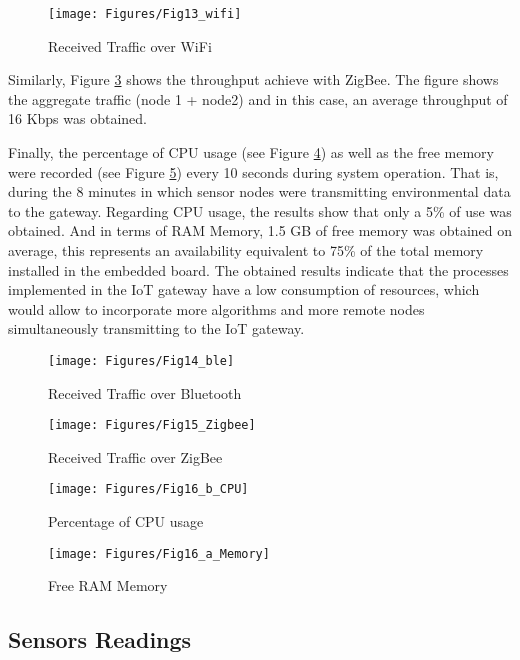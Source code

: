 \begin{figure}[ht!]
\centering
\texttt{[image: Figures/Fig13\_wifi]}
\caption{Received Traffic over WiFi}
\label{ch5_fig:13}       %
\end{figure}

Similarly, Figure \ref{ch5_fig:15} shows the throughput achieve with ZigBee. The figure shows the aggregate traffic (node 1 + node2) and in this case, an average throughput of 16 Kbps was obtained. 

Finally, the percentage of CPU usage (see Figure \ref{ch5_fig:16b}) as well as the free memory were recorded (see Figure \ref{ch5_fig:16a}) every 10 seconds during system operation. That is, during the 8 minutes in which sensor nodes were transmitting environmental data to the gateway. Regarding CPU usage, the results show that only a 5\% of use was obtained. And in terms of RAM Memory, 1.5 GB of free memory was obtained on average, this represents an availability equivalent to 75\% of the total memory installed in the embedded board. The obtained results indicate that the processes implemented in the IoT gateway have a low consumption of resources, which would allow to incorporate more algorithms and more remote nodes simultaneously transmitting to the IoT gateway.

\begin{figure}[ht!]
\centering
\texttt{[image: Figures/Fig14\_ble]}
\caption{Received Traffic over Bluetooth}
\label{ch5_fig:14}       %
\end{figure}

\begin{figure}[hbt!]
\centering
\texttt{[image: Figures/Fig15\_Zigbee]}
\caption{Received Traffic over ZigBee}
\label{ch5_fig:15}       %
\end{figure}

\begin{figure}[hbt!]
\centering
\texttt{[image: Figures/Fig16\_b\_CPU]}
\caption{Percentage of CPU usage}
\label{ch5_fig:16b}
\end{figure}

\begin{figure}[hbt!]
\centering
\texttt{[image: Figures/Fig16\_a\_Memory]}
\caption{Free RAM Memory}
\label{ch5_fig:16a}
\end{figure}

\subsection{Sensors Readings}

